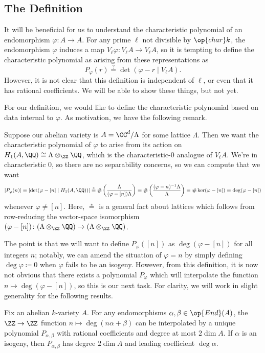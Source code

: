 \documentclass{amsart}
\begin{document}
\subsection{The Definition}
It will be beneficial for us to understand the characteristic polynomial of an endomorphism $\varphi\colon A\to A$. For any prime $\ell$ not divisible by $\op{char}k$, the endomorphism $\varphi$ induces a map $V_\ell\varphi\colon V_\ell A\to V_\ell A$, so it is tempting to define the characteristic polynomial as arising from these representations as
\[P_\varphi(r)\stackrel?=\det(\varphi-r\mid V_\ell A).\]
However, it is not clear that this definition is independent of $\ell$, or even that it has rational coefficients. We will be able to show these things, but not yet.

For our definition, we would like to define the characteristic polynomial based on data internal to $\varphi$. As motivation, we have the following remark.
\begin{remark}
	Suppose our abelian variety is $A=\CC^d/\Lambda$ for some lattice $\Lambda$. Then we want the characteristic polynomial of $\varphi$ to arise from its action on $H_1(A,\QQ)\cong\Lambda\otimes_\ZZ\QQ$, which is the characteristic-$0$ analogue of $V_\ell A$. We're in characteristic $0$, so there are no separability concerns, so we can compute that we want
	\[\left|P_\varphi(n)\right|=\left|\det(\varphi-[n]\mid H_1(A,\QQ))\right|\stackrel*=\#\left(\frac{\Lambda}{(\varphi-[n])\Lambda}\right)=\#\left(\frac{(\varphi-n)^{-1}\Lambda}{\Lambda}\right)=\#\ker(\varphi-[n])=\deg(\varphi-[n])\]
	whenever $\varphi\ne [n]$. Here, $\stackrel*=$ is a general fact about lattices which follows from row-reducing the vector-space isomorphism $(\varphi-[n])\colon(\Lambda\otimes_\ZZ\QQ)\to(\Lambda\otimes_\ZZ\QQ)$.
\end{remark}
The point is that we will want to define $P_\varphi([n])$ as $\deg(\varphi-[n])$ for all integers $n$; notably, we can amend the situation of $\varphi=n$ by simply defining $\deg\varphi\coloneqq0$ when $\varphi$ fails to be an isogeny. However, from this definition, it is now not obvious that there exists a polynomial $P_\varphi$ which will interpolate the function $n\mapsto\deg(\varphi-[n])$, so this is our next task. For clarity, we will work in slight generality for the following results.
\begin{lemma} \label{lem:almost-char-poly}
	Fix an abelian $k$-variety $A$. For any endomorphisms $\alpha,\beta\in\op{End}(A)$, the $\ZZ\to\ZZ$ function $n\mapsto\deg(n\alpha+\beta)$ can be interpolated by a unique polynomial $P_{\alpha,\beta}$ with rational coefficients and degree at most $2\dim A$. If $\alpha$ is an isogeny, then $P_{\alpha,\beta}$ has degree $2\dim A$ and leading coefficient $\deg\alpha$.
\end{lemma}
\end{document}
